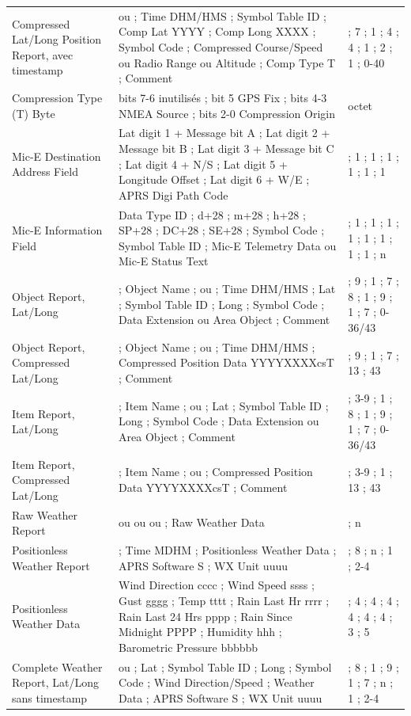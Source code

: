 {\begin{longtable}{@{}>{\raggedright\arraybackslash}p{.24\linewidth}>{\raggedright\arraybackslash}p{.56\linewidth}>{\raggedright\arraybackslash}p{.16\linewidth}@{}}
Compressed Lat/Long Position Report, avec timestamp & \lit{/} ou \lit{@} ; Time DHM/HMS ; Symbol Table ID ; Comp Lat YYYY ; Comp Long XXXX ; Symbol Code ; Compressed Course/Speed ou Radio Range ou Altitude ; Comp Type T ; Comment & 1 ; 7 ; 1 ; 4 ; 4 ; 1 ; 2 ; 1 ; 0-40 \\
Compression Type (T) Byte & bits 7-6 inutilisés ; bit 5 GPS Fix ; bits 4-3 NMEA Source ; bits 2-0 Compression Origin & 1 octet \\
Mic-E Destination Address Field & Lat digit 1 + Message bit A ; Lat digit 2 + Message bit B ; Lat digit 3 + Message bit C ; Lat digit 4 + N/S ; Lat digit 5 + Longitude Offset ; Lat digit 6 + W/E ; APRS Digi Path Code & 1 ; 1 ; 1 ; 1 ; 1 ; 1 ; 1 \\
Mic-E Information Field & Data Type ID ; d+28 ; m+28 ; h+28 ; SP+28 ; DC+28 ; SE+28 ; Symbol Code ; Symbol Table ID ; Mic-E Telemetry Data ou Mic-E Status Text & 1 ; 1 ; 1 ; 1 ; 1 ; 1 ; 1 ; 1 ; 1 ; n \\
Object Report, Lat/Long & \lit{;} ; Object Name ; \lit{*} ou \lit{\_} ; Time DHM/HMS ; Lat ; Symbol Table ID ; Long ; Symbol Code ; Data Extension ou Area Object ; Comment & 1 ; 9 ; 1 ; 7 ; 8 ; 1 ; 9 ; 1 ; 7 ; 0-36/43 \\
Object Report, Compressed Lat/Long & \lit{;} ; Object Name ; \lit{*} ou \lit{\_} ; Time DHM/HMS ; Compressed Position Data \lit{/}YYYYXXXX\lit{\$}csT ; Comment & 1 ; 9 ; 1 ; 7 ; 13 ; 43 \\
Item Report, Lat/Long & \lit{)} ; Item Name ; \lit{!} ou \lit{\_} ; Lat ; Symbol Table ID ; Long ; Symbol Code ; Data Extension ou Area Object ; Comment & 1 ; 3-9 ; 1 ; 8 ; 1 ; 9 ; 1 ; 7 ; 0-36/43 \\
Item Report, Compressed Lat/Long & \lit{)} ; Item Name ; \lit{!} ou \lit{\_} ; Compressed Position Data \lit{/}YYYYXXXX\lit{\$}csT ; Comment & 1 ; 3-9 ; 1 ; 13 ; 43 \\
Raw Weather Report & \lit{!} ou \lit{\#} ou \lit{\$} ou \lit{*} ; Raw Weather Data & 1 ; n \\
Positionless Weather Report & \lit{\_} ; Time MDHM ; Positionless Weather Data ; APRS Software S ; WX Unit uuuu & 1 ; 8 ; n ; 1 ; 2-4 \\
Positionless Weather Data & Wind Direction cccc ; Wind Speed ssss ; Gust gggg ; Temp tttt ; Rain Last Hr rrrr ; Rain Last 24 Hrs pppp ; Rain Since Midnight PPPP ; Humidity hhh ; Barometric Pressure bbbbbb & 4 ; 4 ; 4 ; 4 ; 4 ; 4 ; 4 ; 3 ; 5 \\
Complete Weather Report, Lat/Long sans timestamp & \lit{!} ou \lit{=} ; Lat ; Symbol Table ID ; Long ; Symbol Code \lit{\_} ; Wind Direction/Speed ; Weather Data ; APRS Software S ; WX Unit uuuu & 1 ; 8 ; 1 ; 9 ; 1 ; 7 ; n ; 1 ; 2-4 \\

\end{longtable}}
